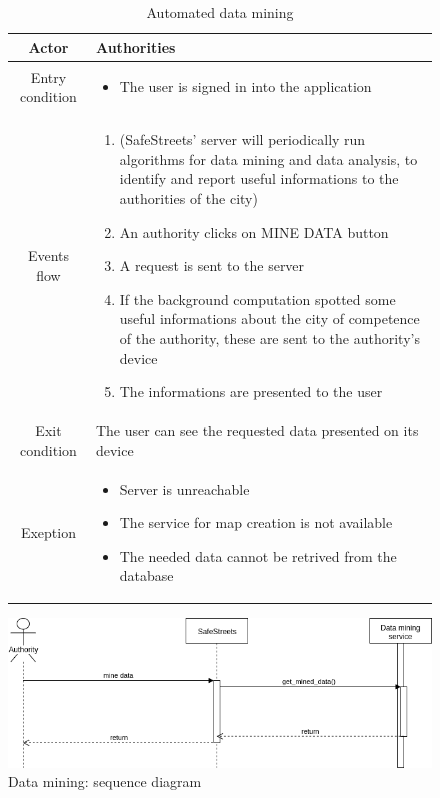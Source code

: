 \documentclass{article}
\begin{document}
		
	\begin{figure}
		\begin{table} [H]
		\begin{center}
		\caption{Automated data mining}
		\begin{tabular}{|c|p{8cm}|}
			\hline
			Actor			&	Authorities\\
			\hline
			Entry condition	&	\begin{itemize}[noitemsep,topsep=0pt]
									\item The user is signed in into the application
								\end{itemize}\\
			\hline
			 Events flow		&	\begin{enumerate}[noitemsep,topsep=0pt]
									\item (SafeStreets' server will periodically run algorithms
									for data mining and data analysis, to identify and report
									useful informations to the authorities of the city)
									\item An authority clicks on MINE DATA button
									\item A request is sent to the server
									\item If the background computation spotted some useful
									informations about the city of competence of the authority,
									these are sent to the authority's device
									\item The informations are presented to the user
								\end{enumerate}\\
			\hline
			Exit condition	& 	The user can see the requested data presented on its device\\
			\hline
			Exeption			& 	\begin{itemize}[noitemsep,topsep=0pt]
									\item Server is unreachable
									\item The service for map creation is not available
									\item The needed data cannot be retrived from the database
								\end{itemize}\\
			\hline
		\end{tabular}
		\end{center}
		\end{table} 
		
		\includegraphics[width=\linewidth]{UML/Data_mining_sequence_diagram.png}
		\caption{Data mining: sequence diagram}
	\end{figure}
\end{document}
